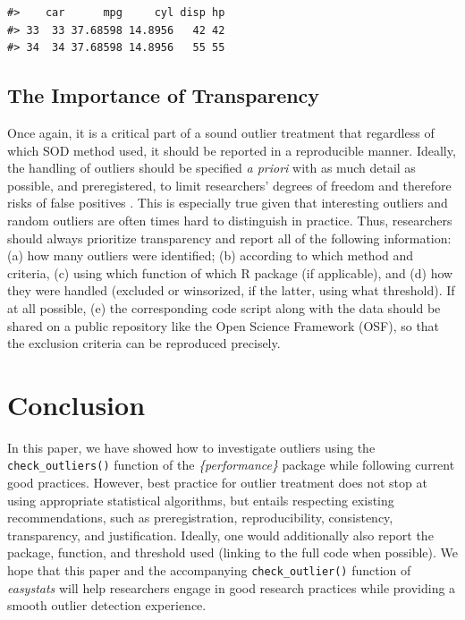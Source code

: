 \documentclass[mathematics,article,submit,moreauthors,pdftex]{mdpi}
\begin{document}
\begin{verbatim}
#>    car      mpg     cyl disp hp
#> 33  33 37.68598 14.8956   42 42
#> 34  34 37.68598 14.8956   55 55
\end{verbatim}

\hypertarget{the-importance-of-transparency}{%
\subsection{The Importance of
Transparency}\label{the-importance-of-transparency}}

Once again, it is a critical part of a sound outlier treatment that
regardless of which SOD method used, it should be reported in a
reproducible manner. Ideally, the handling of outliers should be
specified \emph{a priori} with as much detail as possible, and
preregistered, to limit researchers' degrees of freedom and therefore
risks of false positives \citep{leys2019outliers}. This is especially
true given that interesting outliers and random outliers are often times
hard to distinguish in practice. Thus, researchers should always
prioritize transparency and report all of the following information: (a)
how many outliers were identified; (b) according to which method and
criteria, (c) using which function of which R package (if applicable),
and (d) how they were handled (excluded or winsorized, if the latter,
using what threshold). If at all possible, (e) the corresponding code
script along with the data should be shared on a public repository like
the Open Science Framework (OSF), so that the exclusion criteria can be
reproduced precisely.

\hypertarget{conclusion}{%
\section{Conclusion}\label{conclusion}}

In this paper, we have showed how to investigate outliers using the
\texttt{check\_outliers()} function of the \emph{\{performance\}}
package while following current good practices. However, best practice
for outlier treatment does not stop at using appropriate statistical
algorithms, but entails respecting existing recommendations, such as
preregistration, reproducibility, consistency, transparency, and
justification. Ideally, one would additionally also report the package,
function, and threshold used (linking to the full code when possible).
We hope that this paper and the accompanying \texttt{check\_outlier()}
function of \emph{easystats} will help researchers engage in good
research practices while providing a smooth outlier detection
experience.
\end{document}

